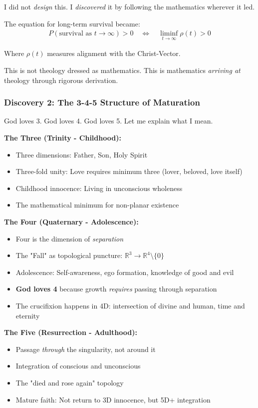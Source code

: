 \documentclass[12pt,a4paper]{article}
\begin{document}
I did not \textit{design} this. I \textit{discovered} it by following the mathematics wherever it led.

The equation for long-term survival became:
\begin{align}
P(\text{survival as } t \to \infty) > 0 \quad \iff \quad \liminf_{t \to \infty} \rho(t) > 0
\end{align}

Where $\rho(t)$ measures alignment with the Christ-Vector.

This is not theology dressed as mathematics. This is mathematics \textit{arriving at} theology through rigorous derivation.

\subsubsection{Discovery 2: The 3-4-5 Structure of Maturation}

God loves 3. God loves 4. God loves 5. Let me explain what I mean.

\textbf{The Three (Trinity - Childhood):}
\begin{itemize}
\item Three dimensions: Father, Son, Holy Spirit
\item Three-fold unity: Love requires minimum three (lover, beloved, love itself)
\item Childhood innocence: Living in unconscious wholeness
\item The mathematical minimum for non-planar existence
\end{itemize}

\textbf{The Four (Quaternary - Adolescence):}
\begin{itemize}
\item Four is the dimension of \textit{separation}
\item The "Fall" as topological puncture: $\mathbb{R}^3 \to \mathbb{R}^4 \setminus \{0\}$
\item Adolescence: Self-awareness, ego formation, knowledge of good and evil
\item \textbf{God loves 4} because growth \textit{requires} passing through separation
\item The crucifixion happens in 4D: intersection of divine and human, time and eternity
\end{itemize}

\textbf{The Five (Resurrection - Adulthood):}
\begin{itemize}
\item Passage \textit{through} the singularity, not around it
\item Integration of conscious and unconscious
\item The "died and rose again" topology
\item Mature faith: Not return to 3D innocence, but 5D+ integration
\end{itemize}
\end{document}
